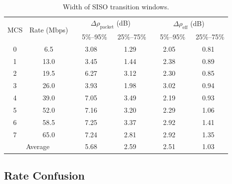 \begin{table}
\centering
\begin{tabular}{cccccc}
\toprule
\multirow{2}{*}{MCS} & \multirow{2}{*}{Rate (Mbps)} & \multicolumn{2}{c}{$\Delta\rho_{\text{packet}}$ (dB)} &
\multicolumn{2}{c}{$\Delta\rho_{\text{eff}}$ (dB)} \\ 
\cmidrule(lr){3-4} \cmidrule(lr){5-6}
& &  ~~5\%--95\% & ~25\%--75\% & ~~5\%--95\% & ~25\%--75\%  \\
\midrule 
0 &  6.5                    & 3.08  & 1.29  & 2.05  & 0.81 \\
1 & 13.0                    & 3.45  & 1.44  & 2.38  & 0.89 \\
2 & 19.5                    & 6.27  & 3.12  & 2.30  & 0.85 \\
3 & 26.0                    & 3.93  & 1.98  & 3.02  & 0.94 \\
4 & 39.0                    & 7.05  & 3.49  & 2.19  & 0.93 \\
5 & 52.0                    & 7.16  & 3.20  & 2.29  & 1.06 \\
6 & 58.5                    & 7.25  & 3.37  & 2.92  & 1.41 \\
7 & 65.0                    & 7.24  & 2.81  & 2.92  & 1.35 \\
\midrule
\multicolumn{2}{c}{Average} & 5.68  & 2.59  & 2.51  & 1.03 \\         
\bottomrule
\end{tabular}
\caption[Width of SISO transition windows]{\label{tab:transitions} Width of SISO transition windows.}
\end{table}

\subsection{Rate Confusion}
\label{sec:rate_confusion}

